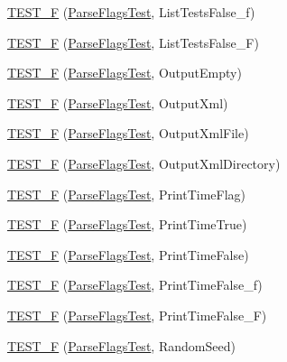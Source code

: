 \begin{DoxyCompactItemize}
\mbox{\hyperlink{namespacetesting_a381c90024f28d66ed25e687a94c8b329}{T\+E\+S\+T\+\_\+F}} (\mbox{\hyperlink{classtesting_1_1ParseFlagsTest}{Parse\+Flags\+Test}}, List\+Tests\+False\+\_\+f)
\item 
\mbox{\hyperlink{namespacetesting_a05a7a818dedb4fdf5b0aac632d97e2dc}{T\+E\+S\+T\+\_\+F}} (\mbox{\hyperlink{classtesting_1_1ParseFlagsTest}{Parse\+Flags\+Test}}, List\+Tests\+False\+\_\+F)
\item 
\mbox{\hyperlink{namespacetesting_a27d34eacec5189fae8349b4a96aea619}{T\+E\+S\+T\+\_\+F}} (\mbox{\hyperlink{classtesting_1_1ParseFlagsTest}{Parse\+Flags\+Test}}, Output\+Empty)
\item 
\mbox{\hyperlink{namespacetesting_addbcb86017a124d8e6afbc6933b7c251}{T\+E\+S\+T\+\_\+F}} (\mbox{\hyperlink{classtesting_1_1ParseFlagsTest}{Parse\+Flags\+Test}}, Output\+Xml)
\item 
\mbox{\hyperlink{namespacetesting_aba922f243ca36645e7001596dc61ad9b}{T\+E\+S\+T\+\_\+F}} (\mbox{\hyperlink{classtesting_1_1ParseFlagsTest}{Parse\+Flags\+Test}}, Output\+Xml\+File)
\item 
\mbox{\hyperlink{namespacetesting_aa3fd714488b3f3caa6af5394a63d38f4}{T\+E\+S\+T\+\_\+F}} (\mbox{\hyperlink{classtesting_1_1ParseFlagsTest}{Parse\+Flags\+Test}}, Output\+Xml\+Directory)
\item 
\mbox{\hyperlink{namespacetesting_a9442229ba2091a4f892a36519f458be8}{T\+E\+S\+T\+\_\+F}} (\mbox{\hyperlink{classtesting_1_1ParseFlagsTest}{Parse\+Flags\+Test}}, Print\+Time\+Flag)
\item 
\mbox{\hyperlink{namespacetesting_ae26478ca77d32fa5a519294b23a423f2}{T\+E\+S\+T\+\_\+F}} (\mbox{\hyperlink{classtesting_1_1ParseFlagsTest}{Parse\+Flags\+Test}}, Print\+Time\+True)
\item 
\mbox{\hyperlink{namespacetesting_aae74ae96560ea57a139eb6c8f502aa35}{T\+E\+S\+T\+\_\+F}} (\mbox{\hyperlink{classtesting_1_1ParseFlagsTest}{Parse\+Flags\+Test}}, Print\+Time\+False)
\item 
\mbox{\hyperlink{namespacetesting_a4d0ef8499ed9a23e0e4b6d8ae66a61c8}{T\+E\+S\+T\+\_\+F}} (\mbox{\hyperlink{classtesting_1_1ParseFlagsTest}{Parse\+Flags\+Test}}, Print\+Time\+False\+\_\+f)
\item 
\mbox{\hyperlink{namespacetesting_a776cc6047fe6c96564bea11143aebc3e}{T\+E\+S\+T\+\_\+F}} (\mbox{\hyperlink{classtesting_1_1ParseFlagsTest}{Parse\+Flags\+Test}}, Print\+Time\+False\+\_\+F)
\item 
\mbox{\hyperlink{namespacetesting_a8c91f18e468506e7d64fa57fdec303c4}{T\+E\+S\+T\+\_\+F}} (\mbox{\hyperlink{classtesting_1_1ParseFlagsTest}{Parse\+Flags\+Test}}, Random\+Seed)

\end{DoxyCompactItemize}

